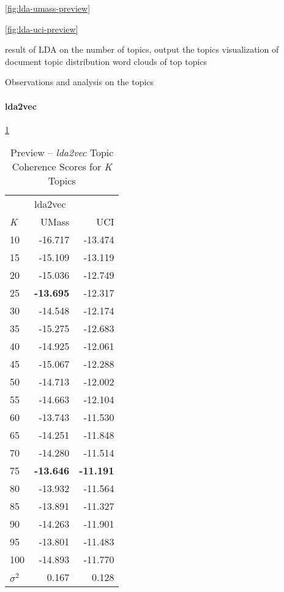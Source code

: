 \documentclass[letterpaper,12pt]{article}
\begin{document}
\ref{fig:lda-umass-preview}

\ref{fig:lda-uci-preview}
\newpage

result of LDA on the number of topics, output the topics
visualization of document topic distribution
word clouds of top topics

Observations and analysis on the topics

\paragraph{lda2vec}
\ref{tab:lda2vec_preview_tc}
\begin{table}
	\caption{\label{tab:lda2vec_preview_tc} Preview -- \emph{lda2vec} Topic Coherence Scores for \emph{K} Topics}
	\begin{center}
		\begin{tabular}{lrr}
			\toprule
			{} & \multicolumn{2}{l}{lda2vec} \\
			\emph{K} &   UMass &     UCI \\
			\midrule
			10  & -16.717 & -13.474 \\
			15  & -15.109 & -13.119 \\
			20  & -15.036 & -12.749 \\
			25  & \textbf{-13.695} & -12.317 \\
			30  & -14.548 & -12.174 \\
			35  & -15.275 & -12.683 \\
			40  & -14.925 & -12.061 \\
			45  & -15.067 & -12.288 \\
			50  & -14.713 & -12.002 \\
			55  & -14.663 & -12.104 \\
			60  & -13.743 & -11.530 \\
			65  & -14.251 & -11.848 \\
			70  & -14.280 & -11.514 \\
			75  & \textbf{-13.646} & \textbf{-11.191} \\
			80  & -13.932 & -11.564 \\
			85  & -13.891 & -11.327 \\
			90  & -14.263 & -11.901 \\
			95  & -13.801 & -11.483 \\
			100 & -14.893 & -11.770 \\
			\midrule
			$\sigma^2$ & 0.167 & 0.128 \\
			\bottomrule
			\end{tabular}
	\end{center}
\end{table}
\end{document}

